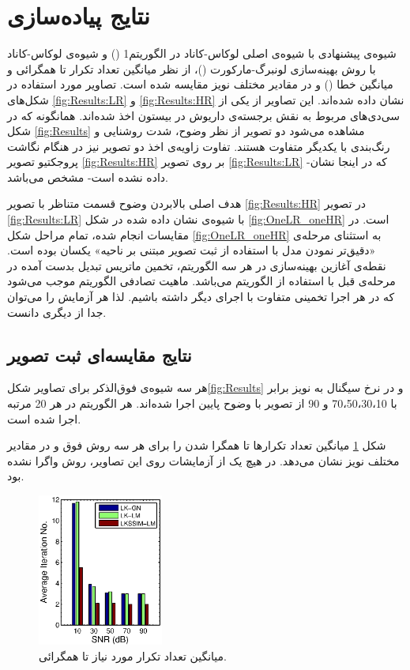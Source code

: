\documentclass[11pt,a4paper,twocolumn]{article}
\begin{document}
\section{نتایج پیاده‌سازی}\label{Sec:ExperimentalResults}
شیوه‌ی پیشنهادی  با شیوه‌ی اصلی لوکاس-کاناد\cite{Lucas81iterative} در الگوریتم1 () و شیوه‌ی لوکاس-کاناد با روش بهینه‌سازی لونبرگ-مارکورت\cite{Szeliski96video} ()، از نظر میانگین تعداد تکرار تا همگرائی و میانگین خطا () و در مقادیر مختلف نویز مقایسه شده است. تصاویر مورد استفاده در شکل‌های \ref{fig:Results:LR} و \ref{fig:Results:HR} نشان داده شده‌اند. این تصاویر از یکی از سی‌دی‌های مربوط به نقش برجسته‌ی داریوش در بیستون اخذ شده‌اند. همانگونه که در شکل \ref{fig:Results} مشاهده می‌شود دو تصویر از نظر وضوح، شدت روشنایی و رنگ‌بندی با یکدیگر متفاوت هستند. تفاوت زاویه‌ی اخذ دو تصویر نیز در هنگام نگاشت پروجکتیو تصویر \ref{fig:Results:HR} بر روی تصویر \ref{fig:Results:LR} -که در اینجا نشان داده نشده است- مشخص می‌باشد.

 هدف اصلی بالابردن وضوح قسمت متناظر با تصویر \ref{fig:Results:HR} در تصویر \ref{fig:Results:LR} با شیوه‌ی نشان داده شده در شکل \ref{fig:OneLR_oneHR} است. در مقایسات انجام شده، تمام مراحل شکل \ref{fig:OneLR_oneHR} به استثنای مرحله‌ی «دقیق‌تر نمودن مدل با استفاده از ثبت تصویر مبتنی بر ناحیه» یکسان بوده است. نقطه‌ی آغازین بهینه‌سازی در هر سه الگوریتم، تخمین ماتریس تبدیل بدست آمده در مرحله‌ی قبل با استفاده از الگوریتم  می‌باشد. 
ماهیت تصادفی الگوریتم  موجب می‌شود که در هر اجرا تخمینی متفاوت با اجرای دیگر داشته باشیم. لذا هر 
آزمایش را می‌توان جدا از دیگری دانست. 


\subsection{نتایج مقایسه‌ای ثبت تصویر}
هر سه شیوه‌ی فوق‌الذکر برای تصاویر شکل\ref{fig:Results} و در نرخ سیگنال به نویز برابر با 70،50،30،10 و 90  از تصویر با وضوح پایین اجرا شده‌اند. هر الگوریتم در هر  20 مرتبه اجرا شده است. 

شکل \ref{fig:Conv_Iter} میانگین تعداد تکرارها تا همگرا شدن را برای هر سه روش فوق و در مقادیر مختلف نویز نشان می‌دهد. در هیچ یک از آزمایشات روی این تصاویر، روش  واگرا نشده بود.

\begin{figure}[tp]
\centering
\includegraphics*[height=50mm, width = 0.7\columnwidth]{Images/Afsaran_mean_conv_iter.eps}
\caption{ میانگین تعداد تکرار مورد نیاز تا همگرائی.}
\label{fig:Conv_Iter}
\end{figure}
\end{document}
